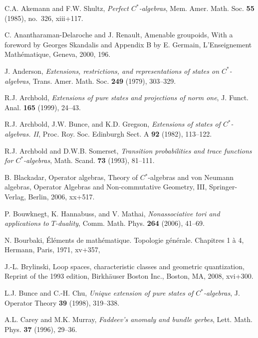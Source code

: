 \documentclass[12pt,a4paper]{amsart}
\begin{document}
\begin{thebibliography}{00}
 C.A. Akemann  and F.W. Shultz,
    \emph{Perfect {$C^\ast$}-algebras}, Mem. Amer. Math. Soc.
    \textbf{55} (1985), no.~326, xiii+117.

 C. Anantharaman-Delaroche  and J. Renault,
    Amenable groupoids, With a foreword by Georges Skandalis and
    Appendix B by E. Germain, L'Enseignement Math\'ematique,
    Geneva, 2000, 196.

 J. Anderson, \emph{Extensions,
    restrictions, and representations of states on {$C^{\ast}
    $}-algebras}, Trans. Amer. Math. Soc. \textbf{249} (1979),
    303--329.

 R.J. Archbold, \emph{Extensions of pure states and projections of norm one}, J. Funct. Anal. \textbf{165} (1999), 24--43.

 R.J. Archbold, J.W. Bunce, and K.D. Gregson,
    \emph{Extensions of states of {$C^{\ast} $}-algebras. {II}},
    Proc. Roy. Soc. Edinburgh Sect. A \textbf{92} (1982),
    113--122.

 R.J. Archbold  and D.W.B. Somerset,
    \emph{Transition probabilities and trace functions for
    {$C^*$}-algebras}, Math. Scand. \textbf{73} (1993),
    81--111.

 B. Blackadar, Operator algebras, Theory of
    $C{^{*}}$-algebras and von Neumann algebras, Operator
    Algebras and Non-commutative Geometry, III, Springer-Verlag,
    Berlin, 2006, xx+517.

 P. Bouwknegt, K. Hannabuss, and V. Mathai,
    \emph{Nonassociative tori and applications to
    {$T$}-duality}, Comm. Math. Phys. \textbf{264} (2006),
    41--69.

N. Bourbaki, \'{E}l\'ements de math\'ematique. {T}opologie g\'en\'erale.
{C}hapitres 1 \`a 4, Hermann, Paris, 1971, xv+357,

 J.-L. Brylinski, Loop spaces, characteristic
    classes and geometric quantization, Reprint of the 1993
    edition, Birkh\"auser Boston Inc., Boston, MA, 2008,
    xvi+300.

 L.J. Bunce and C.-H. Chu, \emph{Unique extension of pure states of {$C^*$}-algebras}, J. Operator Theory \textbf{39} (1998), 319--338.

 A.L. Carey  and M.K. Murray, \emph{Faddeev's
    anomaly and bundle gerbes}, Lett. Math. Phys. \textbf{37}
    (1996), 29--36.


\end{thebibliography}
\end{document}
